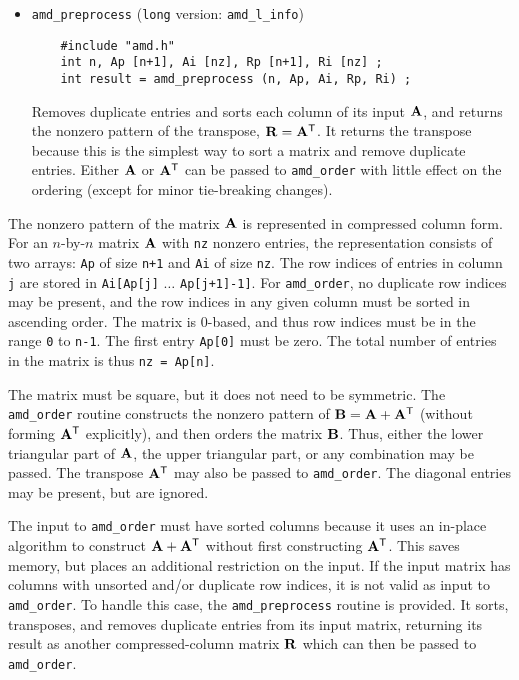\documentclass[11pt]{article}
\newcommand{\m}[1]{{\bf{#1}}}       %
\newcommand{\tr}{^{\sf T}}          %
\begin{document}
\begin{itemize}
\item {\tt amd\_preprocess}
({\tt long} version: {\tt amd\_l\_info})
    {\footnotesize
    \begin{verbatim}
    #include "amd.h"
    int n, Ap [n+1], Ai [nz], Rp [n+1], Ri [nz] ;
    int result = amd_preprocess (n, Ap, Ai, Rp, Ri) ;
    \end{verbatim}
    }
    Removes duplicate entries and sorts each column of its input $\m{A}$,
    and returns the nonzero pattern of the transpose, $\m{R}=\m{A}\tr$.
    It returns the transpose because this is the simplest way to sort
    a matrix and remove duplicate entries.  Either $\m{A}$ or $\m{A}\tr$
    can be passed to {\tt amd\_order} with little effect on the
    ordering (except for minor tie-breaking changes).

\end{itemize}

The nonzero pattern of the matrix $\m{A}$ is represented in compressed column
form.
For an $n$-by-$n$ matrix $\m{A}$ with {\tt nz} nonzero entries, the
representation consists of two arrays: {\tt Ap} of size {\tt n+1} and {\tt Ai}
of size {\tt nz}.  The row indices of entries in column {\tt j} are stored in
    {\tt Ai[Ap[j]} $\ldots$ {\tt Ap[j+1]-1]}.
For {\tt amd\_order},
no duplicate row indices may be present, and the row indices in any given
column must be sorted in ascending order.
The matrix is 0-based, and thus
row indices must be in the range {\tt 0} to {\tt n-1}.
The first entry {\tt Ap[0]} must be zero.
The total number of entries in the matrix is thus {\tt nz = Ap[n]}.

The matrix must be square, but it does not need to be symmetric.
The {\tt amd\_order} routine constructs the nonzero pattern of
$\m{B} = \m{A}+\m{A}\tr$ (without forming $\m{A}\tr$ explicitly),
and then orders the matrix $\m{B}$.  Thus, either the
lower triangular part of $\m{A}$, the upper triangular part,
or any combination may be passed.  The transpose $\m{A}\tr$ may also be
passed to {\tt amd\_order}.
The diagonal entries may be present, but are ignored.

The input to {\tt amd\_order} must have sorted columns because it uses
an in-place algorithm to construct $\m{A}+\m{A}\tr$ without first constructing
$\m{A}\tr$.  This saves memory, but places an additional restriction on
the input.  If the input matrix has columns with unsorted and/or duplicate
row indices, it is not valid as input to {\tt amd\_order}.  To handle this
case, the {\tt amd\_preprocess} routine is provided.  It sorts, transposes,
and removes duplicate entries from its input matrix, returning its result
as another compressed-column matrix $\m{R}$ which can then be passed to
{\tt amd\_order}.
\end{document}
